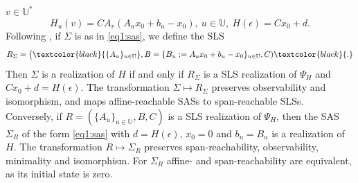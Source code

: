 \documentclass[journal,twoside,web]{ieeecolor}
\begin{document}
    $v \in \mathbb{U}^{*}$
    \[ 
    H_u(v)=CA_v (A_ux_0+b_u-x_0),  ~ u \in \mathbb{U}, ~ H(\epsilon)=Cx_0+d. 
    \]
    Following \cite{Son:Real}, if
    $\Sigma$ is as in \eqref{eq1:sas}, we  define
    the SLS
    \[
    R_{\Sigma}=\bigl(\textcolor{black}{\{A_u\}_{u\in\mathbb{U}}},B=\{B_u:=A_ux_0+b_u-x_0\}_{u\in\mathbb{U}},C)\textcolor{black}{.}
    \]
    Then $\Sigma$ is a realization of $H$
    if and only if $R_{\Sigma}$ is a SLS realization of $\Psi_H$
    and $Cx_0+d=H(\epsilon)$.
    \textcolor{black}{The} transformation
    $\Sigma \mapsto R_{\Sigma}$ preserves observability and isomorphism, and maps affine-reachable SASs to span-reachable SLSs. 
    Conversely, if
    $R=(\{A_{u}\}_{u \in \mathbb{U}},B,C)$
    is a SLS realization of
    $\Psi_H$, then 
    the SAS $\Sigma_R$ of the form
    \eqref{eq1:sas} with $d=H(\epsilon)$, $x_0=0$ and 
     $b_u=B_u$ is a realization of $H$.
     The transformation $R \mapsto \Sigma_R$ preserves 
     span-reachability, observability, minimality and isomorphism.
     For $\Sigma_R$ affine- and span-reachability are equivalent, as its initial state is zero. 
%
     
\end{document}
